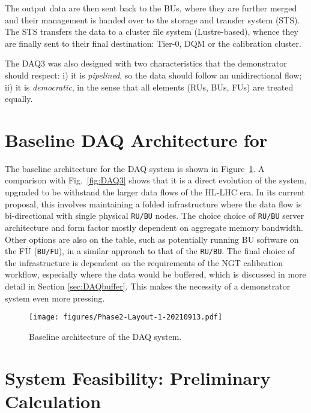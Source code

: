 The output data are then sent back to the BUs, where they are further merged and their management is handed over to the storage and transfer system (STS). The STS  transfers the data to a cluster file system (Lustre-based), whence they are finally sent to their final destination: Tier-0, DQM or the calibration cluster.

The DAQ3 was also designed with two characteristics that the demonstrator should respect: 
i) it is \emph{pipelined}, so the data should follow an unidirectional flow;
ii) it is \emph{democratic}, in the sense that all elements (RUs, BUs, FUs) are treated equally.

\section{Baseline DAQ Architecture for \Phasetwo}\label{sec:DAQP2}

The baseline architecture for  the \Phasetwo DAQ system is shown in Figure~\ref{fig:DAQP2}. A comparison with Fig.~\ref{fig:DAQ3} shows that it is a direct evolution of the \Runtwo system, upgraded to be withstand the larger data flows of the HL-LHC era. In its current proposal, this involves maintaining a folded infrastructure where the data flow is bi-directional with single physical \texttt{RU/BU} nodes. The choice choice of \texttt{RU/BU} server architecture and form factor mostly dependent on aggregate memory bandwidth. Other options are also on the table, such as potentially running BU software on the FU (\texttt{BU/FU}), in a similar approach to that of the \texttt{RU/BU}. The final choice of the infrastructure is dependent on the requirements of the NGT calibration workflow, especially where the data would be buffered, which is discussed in more detail in Section \ref{sec:DAQbuffer}. This makes the necessity of a demonstrator system even more pressing.

\begin{figure}[htbp]
   \centering
	\texttt{[image: figures/Phase2-Layout-1-20210913.pdf]}
  \caption{Baseline architecture of the \Phasetwo DAQ system.}
   \label{fig:DAQP2}
\end{figure}

\section{System Feasibility: Preliminary Calculation}

